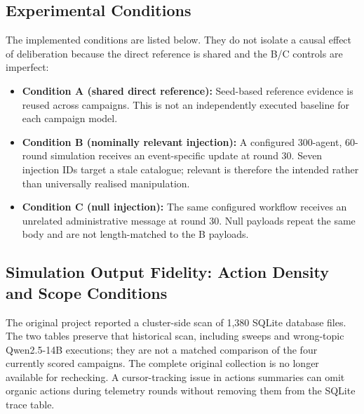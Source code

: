 \subsection{Experimental Conditions}
The implemented conditions are listed below. They do not isolate a causal effect of deliberation because the direct reference is shared and the B/C controls are imperfect:
\begin{itemize}
    \item \textbf{Condition A (shared direct reference):} Seed-based reference evidence is reused across campaigns. This is not an independently executed baseline for each campaign model.
    \item \textbf{Condition B (nominally relevant injection):} A configured 300-agent, 60-round simulation receives an event-specific update at round 30. Seven injection IDs target a stale catalogue; relevant is therefore the intended rather than universally realised manipulation.
    \item \textbf{Condition C (null injection):} The same configured workflow receives an unrelated administrative message at round 30. Null payloads repeat the same body and are not length-matched to the B payloads.
\end{itemize}

\subsection{Simulation Output Fidelity: Action Density and Scope Conditions}
\label{sec:action_fidelity}

The original project reported a cluster-side scan of 1,380 SQLite database files. The two tables preserve that historical scan, including sweeps and wrong-topic Qwen2.5-14B executions; they are not a matched comparison of the four currently scored campaigns. The complete original collection is no longer available for rechecking. A cursor-tracking issue in actions summaries can omit organic actions during telemetry rounds without removing them from the SQLite trace table.

